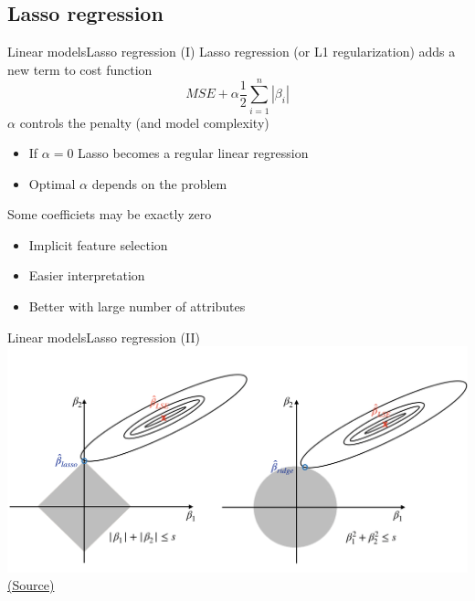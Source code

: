 \documentclass[10pt,compress]{beamer} %
\begin{document}
\subsection{Lasso regression}
\begin{frame}{Linear models}{Lasso regression (I)}
	Lasso regression (or L1 regularization) adds a new term to cost function
    \begin{equation*}
        MSE + \alpha \frac{1}{2} \sum_{i=1}^n |\beta_i|
    \end{equation*}
    $\alpha$ controls the penalty (and model complexity)
	\begin{itemize}
		\item If $\alpha = 0$ Lasso becomes a regular linear regression
        \item Optimal $\alpha$ depends on the problem
	\end{itemize}

    Some coefficiets may be exactly zero
    \begin{itemize}
        \item Implicit feature selection
        \item Easier interpretation
        \item Better with large number of attributes
    \end{itemize}
\end{frame}

\begin{frame}{Linear models}{Lasso regression (II)}
    \centering \includegraphics[width=\linewidth]{figs/lasso-ridge.png}\\
    \tiny{\href{https://scientistcafe.com/ids/variable-selection-property-of-the-lasso}{(Source)}}

\end{frame}
\end{document}
